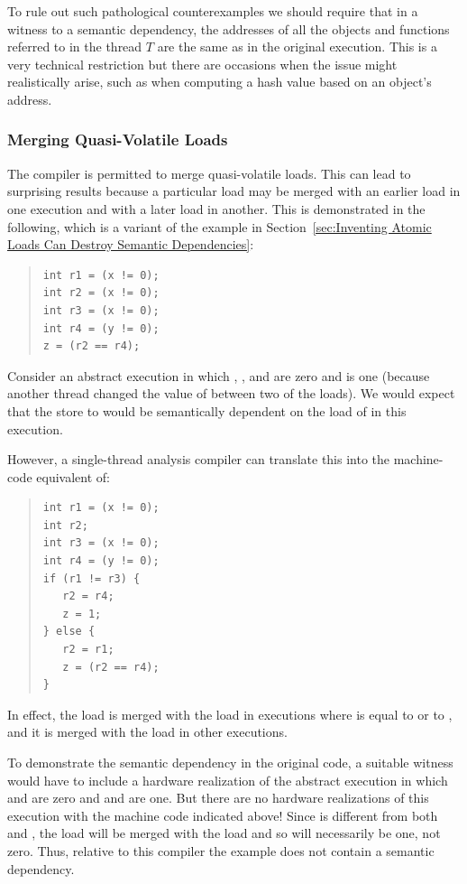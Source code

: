 \documentclass[10]{article}
\begin{document}
To rule out such pathological counterexamples we should require that
in a witness to a semantic dependency, the addresses of all the
objects and functions referred to in the thread $T$ are the same as
in the original execution.
This is a very technical restriction but there are occasions when
the issue might realistically arise, such as when computing a hash
value based on an object's address.

\subsubsection{Merging Quasi-Volatile Loads}
\label{sec:Merging Quasi-Volatile Loads}

The compiler is permitted to merge quasi-volatile loads.
This can lead to surprising results because a particular load
may be merged with an earlier load in one execution and with a
later load in another.
This is demonstrated in the following, which is a variant of
the example in
Section~\ref{sec:Inventing Atomic Loads Can Destroy Semantic Dependencies}:
\begin{quote}
\begin{verbatim}
int r1 = (x != 0);
int r2 = (x != 0);
int r3 = (x != 0);
int r4 = (y != 0);
z = (r2 == r4);
\end{verbatim}
\end{quote}
Consider an abstract execution in which , , and 
are zero and  is one (because another thread changed the value
of  between two of the loads).
We would expect that the store to  would be semantically
dependent on the load of  in this execution.

However, a single-thread analysis compiler can translate this into the
machine-code equivalent of:
\begin{quote}
\begin{verbatim}
int r1 = (x != 0);
int r2;
int r3 = (x != 0);
int r4 = (y != 0);
if (r1 != r3) {
   r2 = r4;
   z = 1;
} else {
   r2 = r1;
   z = (r2 == r4);
}
\end{verbatim}
\end{quote}
In effect, the  load is merged with the  load in
executions where  is equal to  or to , and it is
merged with the  load in other executions.

To demonstrate the semantic dependency in the original code,
a suitable witness would have
to include a hardware realization of the abstract execution in which
 and  are zero and  and  are one.
But there are no hardware realizations of this execution with the
machine code indicated above!
Since  is different from both  and , the 
load will be merged with the  load and so  will
necessarily be one, not zero.
Thus, relative to this compiler the example does not contain a
semantic dependency.
\end{document}
